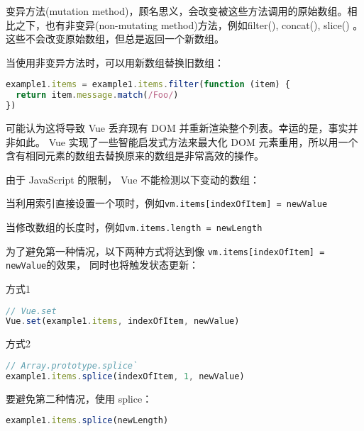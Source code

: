 变异方法(mutation method)，顾名思义，会改变被这些方法调用的原始数组。相比之下，也有非变异(non-mutating method)方法，例如filter(), concat(), slice() 。这些不会改变原始数组，但总是返回一个新数组。

当使用非变异方法时，可以用新数组替换旧数组：


\begin{lstlisting}[language=JavaScript]
example1.items = example1.items.filter(function (item) {
  return item.message.match(/Foo/)
})
\end{lstlisting}

可能认为这将导致 Vue 丢弃现有 DOM 并重新渲染整个列表。幸运的是，事实并非如此。 Vue 实现了一些智能启发式方法来最大化 DOM 元素重用，所以用一个含有相同元素的数组去替换原来的数组是非常高效的操作。


由于 JavaScript 的限制， Vue 不能检测以下变动的数组：

\begin{compactenum}
\item 当利用索引直接设置一个项时，例如\texttt{vm.items[indexOfItem] = newValue}
\item 当修改数组的长度时，例如\texttt{vm.items.length = newLength}
\end{compactenum}


为了避免第一种情况，以下两种方式将达到像 \texttt{vm.items[indexOfItem] = newValue}的效果， 同时也将触发状态更新：

\begin{compactitem}
\item 方式1

\begin{lstlisting}[language=JavaScript]
// Vue.set
Vue.set(example1.items, indexOfItem, newValue)
\end{lstlisting}

\item 方式2

\begin{lstlisting}[language=JavaScript]
// Array.prototype.splice`
example1.items.splice(indexOfItem, 1, newValue)
\end{lstlisting}

\end{compactitem}

要避免第二种情况，使用 splice：





\begin{lstlisting}[language=JavaScript]
example1.items.splice(newLength)
\end{lstlisting}


